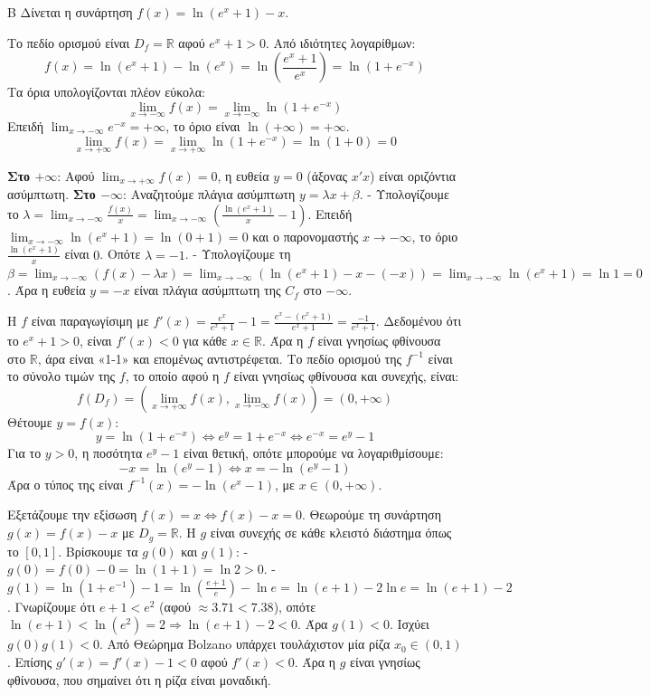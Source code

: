 \begin{thema}{Β}
Δίνεται η συνάρτηση $f(x) = \ln(e^x + 1) - x$.

\begin{erwthma}
\item Το πεδίο ορισμού είναι $D_f = \mathbb{R}$ αφού $e^x+1>0$.
Από ιδιότητες λογαρίθμων:
\[ f(x) = \ln(e^x + 1) - \ln(e^x) = \ln\left( \frac{e^x+1}{e^x} \right) = \ln(1 + e^{-x}) \]
Τα όρια υπολογίζονται πλέον εύκολα:
\[ \lim_{x\to-\infty} f(x) = \lim_{x\to-\infty} \ln(1 + e^{-x}) \]
Επειδή $\lim_{x\to-\infty} e^{-x} = +\infty$, το όριο είναι $\ln(+\infty) = +\infty$.
\[ \lim_{x\to+\infty} f(x) = \lim_{x\to+\infty} \ln(1 + e^{-x}) = \ln(1+0) = 0 \]

\item \textbf{Στο $+\infty$}: 
Αφού $\lim_{x\to+\infty} f(x) = 0$, η ευθεία $y = 0$ (άξονας $x'x$) είναι οριζόντια ασύμπτωτη.
\textbf{Στο $-\infty$}:
Αναζητούμε πλάγια ασύμπτωτη $y = \lambda x + \beta$.
- Υπολογίζουμε το $\lambda = \lim_{x\to-\infty} \frac{f(x)}{x} = \lim_{x\to-\infty} \left( \frac{\ln(e^x+1)}{x} - 1 \right)$.
Επειδή $\lim_{x\to-\infty} \ln(e^x+1) = \ln(0+1) = 0$ και ο παρονομαστής $x \to -\infty$, το όριο $\frac{\ln(e^x+1)}{x}$ είναι $0$. Οπότε $\lambda = -1$.
- Υπολογίζουμε τη $\beta = \lim_{x\to-\infty} (f(x) - \lambda x) = \lim_{x\to-\infty} (\ln(e^x+1) - x - (-x)) = \lim_{x\to-\infty} \ln(e^x+1) = \ln 1 = 0$.
Άρα η ευθεία $y = -x$ είναι πλάγια ασύμπτωτη της $C_f$ στο $-\infty$.

\item Η $f$ είναι παραγωγίσιμη με $f'(x) = \frac{e^x}{e^x+1} - 1 = \frac{e^x - (e^x+1)}{e^x+1} = \frac{-1}{e^x+1}$.
Δεδομένου ότι το $e^x+1 > 0$, είναι $f'(x) < 0$ για κάθε $x \in \mathbb{R}$.
Άρα η $f$ είναι γνησίως φθίνουσα στο $\mathbb{R}$, άρα είναι «1-1» και επομένως αντιστρέφεται.
Το πεδίο ορισμού της $f^{-1}$ είναι το σύνολο τιμών της $f$, το οποίο αφού η $f$ είναι γνησίως φθίνουσα και συνεχής, είναι:
\[ f(D_f) = \left( \lim_{x\to+\infty} f(x), \lim_{x\to-\infty} f(x) \right) = (0, +\infty) \]
Θέτουμε $y = f(x)$:
\[ y = \ln(1+e^{-x}) \Leftrightarrow e^y = 1+e^{-x} \Leftrightarrow e^{-x} = e^y - 1 \]
Για το $y > 0$, η ποσότητα $e^y - 1$ είναι θετική, οπότε μπορούμε να λογαριθμίσουμε:
\[ -x = \ln(e^y - 1) \Leftrightarrow x = -\ln(e^y-1) \]
Άρα ο τύπος της είναι $f^{-1}(x) = -\ln(e^x - 1)$, με $x \in (0, +\infty)$.

\item Εξετάζουμε την εξίσωση $f(x) = x \Leftrightarrow f(x) - x = 0$.
Θεωρούμε τη συνάρτηση $g(x) = f(x) - x$ με $D_g = \mathbb{R}$. H $g$ είναι συνεχής σε κάθε κλειστό διάστημα όπως το $[0, 1]$.
Βρίσκουμε τα $g(0)$ και $g(1)$:
- $g(0) = f(0) - 0 = \ln(1+1) = \ln 2 > 0$.
- $g(1) = \ln(1+e^{-1}) - 1 = \ln\left(\frac{e+1}{e}\right) - \ln e = \ln(e+1) - 2\ln e = \ln(e+1) - 2$.
Γνωρίζουμε ότι $e+1 < e^2$ (αφού $\approx 3.71 < 7.38$), οπότε $\ln(e+1) < \ln(e^2) = 2 \Rightarrow \ln(e+1) - 2 < 0$. Άρα $g(1) < 0$.
Ισχύει $g(0)g(1) < 0$. Από Θεώρημα Bolzano υπάρχει τουλάχιστον μία ρίζα $x_0 \in (0, 1)$.
Επίσης $g'(x) = f'(x) - 1 < 0$ αφού $f'(x) < 0$. Άρα η $g$ είναι γνησίως φθίνουσα, που σημαίνει ότι η ρίζα είναι μοναδική.
\end{erwthma}
\end{thema}
